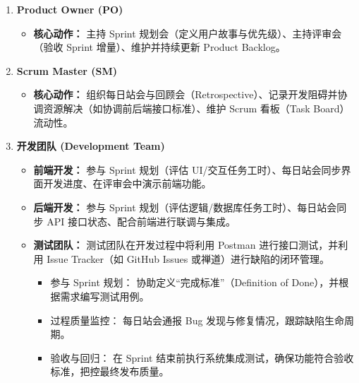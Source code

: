 \begin{enumerate}
    \item \textbf{Product Owner (PO)}
          \begin{itemize}
              \item \textbf{核心动作：} 主持 Sprint 规划会（定义用户故事与优先级）、主持评审会（验收 Sprint 增量）、维护并持续更新 Product Backlog。
          \end{itemize}



    \item \textbf{Scrum Master (SM)}
          \begin{itemize}
              \item \textbf{核心动作：} 组织每日站会与回顾会（Retrospective）、记录开发阻碍并协调资源解决（如协调前后端接口标准）、维护 Scrum 看板（Task Board）流动性。
          \end{itemize}



    \item \textbf{开发团队 (Development Team)}
          \begin{itemize}
              \item \textbf{前端开发：} 参与 Sprint 规划（评估 UI/交互任务工时）、每日站会同步界面开发进度、在评审会中演示前端功能。
              \item \textbf{后端开发：} 参与 Sprint 规划（评估逻辑/数据库任务工时）、每日站会同步 API 接口状态、配合前端进行联调与集成。
              \item \textbf{测试团队：} 测试团队在开发过程中将利用 Postman 进行接口测试，并利用 Issue Tracker（如 GitHub Issues 或禅道）进行缺陷的闭环管理。
                    \begin{itemize}
                        \item 参与 Sprint 规划： 协助定义“完成标准”（Definition of Done），并根据需求编写测试用例。
                        \item 过程质量监控： 每日站会通报 Bug 发现与修复情况，跟踪缺陷生命周期。
                        \item 验收与回归： 在 Sprint 结束前执行系统集成测试，确保功能符合验收标准，把控最终发布质量。
                    \end{itemize}
          \end{itemize}

\end{enumerate}

